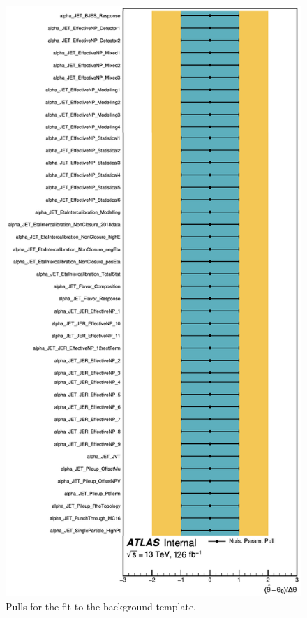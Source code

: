 \begin{figure}
\begin{minipage}{0.5\textwidth}
\includegraphics[width=.9\textwidth]{figures/my_dihiggs/JET-bkg-only-pulls}	
\end{minipage}
\caption{Pulls for the fit to the background template.}
\label{fig:ggf_vbf-pulls-corr-bonly}
\end{figure}

